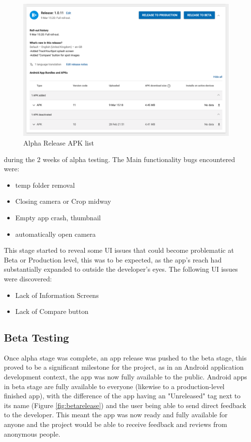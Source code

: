 \begin{figure}
    \includegraphics[width=1.2\textwidth, center]{figures/alpha_releases.png}
    \caption{Alpha Release APK list}
    \label{fig:alpha_releases.png}
\end{figure}
during the 2 weeks of alpha testing. The Main functionality bugs encountered were: 
\begin{itemize}
    \item temp folder removal
    \item Closing camera or Crop midway
    \item Empty app crash, thumbnail 
    \item automatically open camera
\end{itemize}
\par This stage started to reveal some UI issues that could become problematic at Beta or Production level, this was to be expected, as the app's reach had substantially expanded to outside the developer's eyes. The following UI issues were discovered: 
\begin{itemize}
    \item Lack of Information Screens
    \item Lack of Compare button
\end{itemize}

\subsection{Beta Testing}
Once alpha stage was complete, an app release was pushed to the beta stage, this proved to be a significant milestone for the project, as in an Android application development context, the app was now fully available to the public. Android apps in beta stage are fully available to everyone (likewise to a production-level finished app), with the difference of the app having an "Unreleased" tag next to its name (Figure \ref{fig:betarelease}) and the user being able to send direct feedback to the developer. This meant the app was now ready and fully available for anyone and the project would be able to receive feedback and reviews from anonymous people. 

